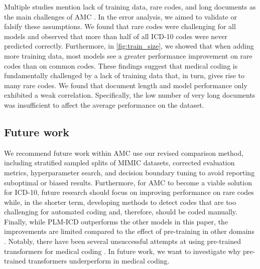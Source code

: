 \documentclass[anonymous=false, sigconf=true, review=false, natbib=true]{acmart}
\begin{document}
Multiple studies mention lack of training data, rare codes, and long documents as the main challenges of AMC \cite{dongExplainableAutomatedCoding2021,feuchtDescriptionbasedLabelAttention2021,huangPLMICDAutomaticICD2022,jiDoesMagicBERT2021,liICDCodingClinical2020,liuEffectiveConvolutionalAttention2021,moonsComparisonDeepLearning2020,pascualBERTbasedAutomaticICD2021,tengReviewDeepNeural2022,tengExplainablePredictionMedical2020, vuLabelAttentionModel2020, venkateshAutomatingOverburdenedClinical2023}. In the error analysis, we aimed to validate or falsify these assumptions. We found that rare codes were challenging for all models and observed that more than half of all ICD-10 codes were never predicted correctly. Furthermore, in \cref{fig:train_size}, we showed that when adding more training data, most models see a greater performance improvement on rare codes than on common codes. 
These findings suggest that medical coding is fundamentally challenged by a lack of training data that, in turn, gives rise to many rare codes.
We found that document length and model performance only exhibited a weak correlation. Specifically, the low number of very long documents was insufficient to affect the average performance on the dataset. 

\subsection{Future work}
We recommend future work within AMC use our revised comparison method, including stratified sampled splits of MIMIC datasets, corrected evaluation metrics, hyperparameter search, and decision boundary tuning to avoid reporting suboptimal or biased results. 
Furthermore, for AMC to become a viable solution for ICD-10, future research should focus on improving performance on rare codes while, in the shorter term, developing methods to detect codes that are too challenging for automated coding and, therefore, should be coded manually. Finally, while PLM-ICD outperforms the other models in this paper, the improvements are limited compared to the effect of pre-training in other domains \cite{mohamedSelfSupervisedSpeechRepresentation2022, linPretrainedTransformersText2021, baevskiWav2vecFrameworkSelfSupervised2020, devlinBERTPretrainingDeep2019, dosovitskiyImageWorth16x162020}.
Notably, there have been several unsuccessful attempts at using pre-trained transformers for medical coding \cite{jiDoesMagicBERT2021,gaoLimitationsTransformersClinical2021,michalopoulosICDBigBirdContextualEmbedding2022,pascualBERTbasedAutomaticICD2021,zhangBERTXMLLargeScale2020}. In future work, we want to investigate why pre-trained transformers underperform in medical coding.
\end{document}
